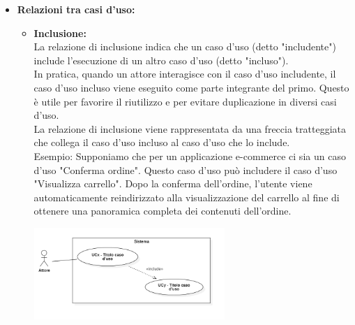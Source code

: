 \begin{itemize}
    \item \textbf{Relazioni tra casi d'uso:}
    \begin{itemize}
        \item \textbf{Inclusione:} \\
        La relazione di inclusione indica che un caso d'uso (detto "includente") include l'esecuzione di un altro caso d'uso (detto "incluso"). \\
        In pratica, quando un attore interagisce con il caso d'uso includente, il caso d'uso incluso viene eseguito come parte integrante del primo. Questo è utile per favorire il riutilizzo e per evitare duplicazione in diversi casi d'uso. \\
        La relazione di inclusione viene rappresentata da una freccia tratteggiata che collega il caso d'uso incluso al caso d'uso che lo include. \\
        Esempio: Supponiamo che per un applicazione e-commerce ci sia un caso d'uso "Conferma ordine". Questo caso d'uso può includere il caso d'uso "Visualizza carrello". Dopo la conferma dell'ordine, l'utente viene automaticamente reindirizzato alla visualizzazione del carrello al fine di ottenere una panoramica completa dei contenuti dell'ordine.
        \begin{minipage}[t]{\linewidth}
            \centering
            \includegraphics[width=0.6\textwidth]{../Images/NormeDiProgetto/Inclusione.PNG}
        \end{minipage}


\end{itemize}
\end{itemize}

